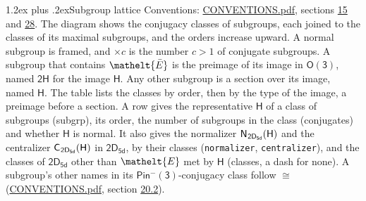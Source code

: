 \documentclass[10pt,a4paper]{article}
\makeatletter
\renewcommand\section{\@startsection{section}{1}{\z@}{-3ex plus -1ex minus -.2ex}%
  {1.2ex plus .2ex}{\normalfont\large\sffamily\bfseries\color{parttitle}}}
\numberwithin{equation}{section}
\newcommand{\eltfont}[1]{{\let\sigma\eltsigma\mathelt{#1}}}
\newcommand{\grp}[1]{\mathsf{#1}}
\newcommand{\cls}[1]{\eltfont{#1}}
\newcommand{\elt}[1]{\eltfont{#1}}
\newcommand{\samecls}{\cong}
\newcommand{\barred}[1]{\bar{#1}}
\newcommand{\hairsp}{\mkern1mu}
\makeatother
\begin{document}
\section{Subgroup lattice}\label{s:subgroups}
Conventions: \href{../../CONVENTIONS.pdf}{CONVENTIONS.pdf}, sections \href{../../../rotation/CONVENTIONS.pdf\#conv.15}{15} and \href{../../CONVENTIONS.pdf\#conv.28}{28}.
The diagram shows the conjugacy classes of subgroups, each joined to the classes of its maximal subgroups, and the orders increase upward. A normal subgroup is framed, and ${\times}c$ is the number $c > 1$ of conjugate subgroups. \label{n:group.H}A subgroup that contains $\elt{\barred{E}}$ is the preimage of its image in $\grp{O(3)}$, named $\grp{2H}$ for the image $\grp{H}$. Any other subgroup is a section over its image, named $\grp{H}$. The table lists the classes by order, then by the type of the image, a preimage before a section. \label{n:head.subgroup}\label{n:head.order}\label{n:head.conjugates}\label{n:head.normal}A row gives the representative $\grp{H}$ of a class of subgroups (subgrp), its order, the number of subgroups in the class (conjugates) and whether $\grp{H}$ is normal. \label{n:group.normalizer}\label{n:group.centralizer}\label{n:head.classes}It also gives the normalizer $\grp{N}_{\hairsp \grp{2D_{5d}}}(\grp{H})$ and the centralizer $\grp{C}_{\hairsp \grp{2D_{5d}}}(\grp{H})$ in $\grp{2D_{5d}}$, by their classes (\texttt{normalizer}, \texttt{centralizer}), and the classes of $\grp{2D_{5d}}$ other than $\cls{E}$ met by $\grp{H}$ (classes, a dash for none). A subgroup's other names in its \href{Pinminus3.pdf}{$\grp{Pin^{-}(3)}$}-conjugacy class follow $\samecls$ (\href{../../CONVENTIONS.pdf}{CONVENTIONS.pdf}, section \href{../../CONVENTIONS.pdf\#conv.20.2}{20.2}).
\end{document}

